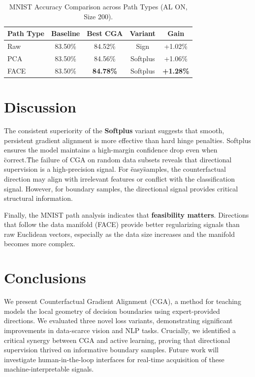 \documentclass[sigconf,anonymous]{aamas}
\begin{document}
\begin{table}[h]
\centering
\caption{MNIST Accuracy Comparison across Path Types (AL ON, Size 200).}
\label{tab:mnist_paths}
\begin{tabular}{lcccc}
\toprule
\textbf{Path Type} & \textbf{Baseline} & \textbf{Best CGA} & \textbf{Variant} & \textbf{Gain} \\ \midrule
Raw & 83.50\% & 84.52\% & Sign & +1.02\%
 \\PCA & 83.50\% & 84.56\% & Softplus & +1.06\%
 \\FACE & 83.50\% & \textbf{84.78\%} & Softplus & \textbf{+1.28\%}
 \\ \bottomrule
\end{tabular}
\end{table}

\section{Discussion}
The consistent superiority of the \textbf{Softplus} variant suggests that smooth, persistent gradient alignment is more effective than hard hinge penalties. Softplus ensures the model maintains a high-margin confidence drop even when \"correct.\" The failure of CGA on random data subsets reveals that directional supervision is a high-precision signal. For \"easy\" samples, the counterfactual direction may align with irrelevant features or conflict with the classification signal. However, for boundary samples, the directional signal provides critical structural information. 

Finally, the MNIST path analysis indicates that \textbf{feasibility matters}. Directions that follow the data manifold (FACE) provide better regularizing signals than raw Euclidean vectors, especially as the data size increases and the manifold becomes more complex.

\section{Conclusions}
We present Counterfactual Gradient Alignment (CGA), a method for teaching models the local geometry of decision boundaries using expert-provided directions. We evaluated three novel loss variants, demonstrating significant improvements in data-scarce vision and NLP tasks. Crucially, we identified a critical synergy between CGA and active learning, proving that directional supervision thrived on informative boundary samples. Future work will investigate human-in-the-loop interfaces for real-time acquisition of these machine-interpretable signals.
\end{document}
